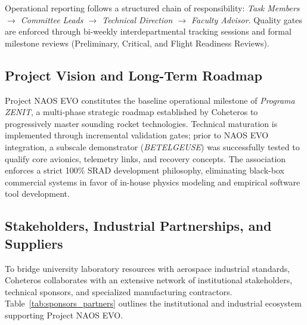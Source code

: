 \documentclass[11pt, a4paper]{article} %
\begin{document}
Operational reporting follows a structured chain of responsibility: \textit{Task Members $\rightarrow$ Committee Leads $\rightarrow$ Technical Direction $\rightarrow$ Faculty Advisor}. Quality gates are enforced through bi-weekly interdepartmental tracking sessions and formal milestone reviews (Preliminary, Critical, and Flight Readiness Reviews).

\newpage %

\subsection{Project Vision and Long-Term Roadmap}
Project NAOS EVO constitutes the baseline operational milestone of \textit{Programa ZENIT}, a multi-phase strategic roadmap established by Coheteros to progressively master sounding rocket technologies. Technical maturation is implemented through incremental validation gates; prior to NAOS EVO integration, a subscale demonstrator (\textit{BETELGEUSE}) was successfully tested to qualify core avionics, telemetry links, and recovery concepts. The association enforces a strict 100\% SRAD development philosophy, eliminating black-box commercial systems in favor of in-house physics modeling and empirical software tool development.

\subsection{Stakeholders, Industrial Partnerships, and Suppliers}
To bridge university laboratory resources with aerospace industrial standards, Coheteros collaborates with an extensive network of institutional stakeholders, technical sponsors, and specialized manufacturing contractors. Table~\ref{tab:sponsors_partners} outlines the institutional and industrial ecosystem supporting Project NAOS EVO.
\end{document}
